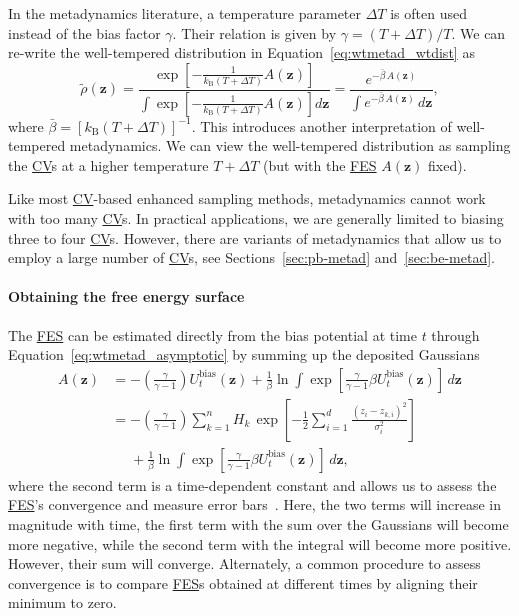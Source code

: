 \documentclass[9pt,review]{livecoms}
\newcommand{\vz}{\mathbf{z}}
\begin{document}
In the metadynamics literature, a temperature parameter $\Delta T$ is often used instead of the bias factor $\gamma$. Their relation is given by $\gamma = (T + \Delta T)/T$. We can re-write the well-tempered distribution in Equation~\ref{eq:wtmetad_wtdist} as
\begin{equation}
\label{eq:wtmetad_wtdist_deltaT}
\tilde{\rho}(\vz) =
\frac
{\exp\left[-\frac{1}{k_\mathrm{B}(T+\Delta T)}A(\vz)\right]}
{\int \exp\left[-\frac{1}{k_\mathrm{B}(T+\Delta T)}A(\vz)\right] d\vz}=
\frac
{e^{-\bar{\beta} \, A(\vz)}}
{\int e^{-\bar{\beta} \, A(\vz)} \, d\vz},
\end{equation}
where $\bar{\beta}=\left[k_\mathrm{B}(T+\Delta T)\right]^{-1}$. This introduces another interpretation of well-tempered metadynamics. We can view the well-tempered distribution as sampling the \hyperlink{ref:CV} {CV}s at a higher temperature $T+\Delta T$ (but with the \hyperlink{ref:FES} {FES} $A(\vz)$ fixed).

Like most \hyperlink{ref:CV} {CV}-based enhanced sampling methods, metadynamics cannot work with too many \hyperlink{ref:CV} {CV}s. In practical applications, we are generally limited to biasing three to four \hyperlink{ref:CV} {CV}s. However, there are variants of metadynamics that allow us to employ a large number of \hyperlink{ref:CV} {CV}s, see Sections~\ref{sec:pb-metad} and~\ref{sec:be-metad}.

\paragraph{Obtaining the free energy surface}
\label{sec:metad_obtaining_fes}
The \hyperlink{ref:FES} {FES} can be estimated directly from the bias potential at time $t$ through Equation~\ref{eq:wtmetad_asymptotic} by summing up the deposited Gaussians
\begin{align}
\label{eq:metad_sumhills}
A(\vz) &=
- \left(\frac{\gamma}{\gamma-1}\right) U_{t}^{\mathrm{bias}}(\vz) +
\frac{1}{\beta}
\ln
\int \exp
\left[
\frac{\gamma}{\gamma-1} \beta U_{t}^{\mathrm{bias}}(\vz)
\right] \, d\vz
\nonumber
\\
& =
- \left(\frac{\gamma}{\gamma-1}\right)
\sum_{k=1}^{n}
H_{k} \,
\exp \left[-\frac{1}{2}\sum^{d}_{i=1} \frac{(z_i-z_{k,i})^2}{\sigma^2_i} \right]
\nonumber \\
& \phantom{=}
+
\frac{1}{\beta}
\ln
\int \exp
\left[
\frac{\gamma}{\gamma-1} \beta U_{t}^{\mathrm{bias}}(\vz)
\right] \, d\vz
,
\end{align}
where the second term is a time-dependent constant and allows us to assess the \hyperlink{ref:FES} {FES}'s convergence and measure error bars~\cite{tiwary_rewt,Valsson2016_ARPC_MetaD}. Here, the two terms will increase in magnitude with time, the first term with the sum over the Gaussians will become more negative, while the second term with the integral will become more positive. However, their sum will converge. Alternately, a common procedure to assess convergence is to compare \hyperlink{ref:FES} {FES}s obtained at different times by aligning their minimum to zero.
\end{document}
